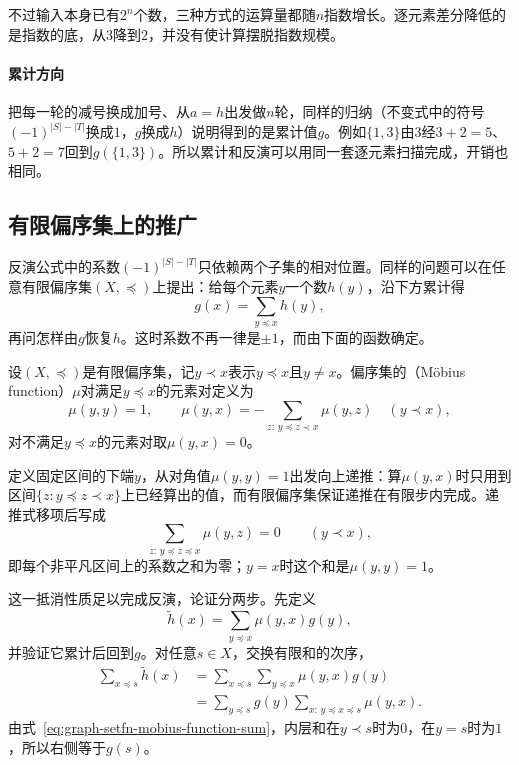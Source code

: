 不过输入本身已有$2^n$个数，三种方式的运算量都随$n$指数增长。逐元素差分降低的是指数的底，从$3$降到$2$，并没有使计算摆脱指数规模。

\paragraph{累计方向}
把每一轮的减号换成加号、从$a=h$出发做$n$轮，同样的归纳（不变式中的符号$(-1)^{|S|-|T|}$换成$1$，$g$换成$h$）说明得到的是累计值$g$。例如$\{1,3\}$由$3$经$3+2=5$、$5+2=7$回到$g(\{1,3\})$。所以累计和反演可以用同一套逐元素扫描完成，开销也相同。

\subsection{有限偏序集上的推广}
\label{sec:graph-setfn-poset-mobius}

反演公式中的系数$(-1)^{|S|-|T|}$只依赖两个子集的相对位置。同样的问题可以在任意有限偏序集$(X,\preceq)$上提出：给每个元素$y$一个数$h(y)$，沿下方累计得
\[
  g(x)=\sum_{y\preceq x}h(y),
\]
再问怎样由$g$恢复$h$。这时系数不再一律是$\pm1$，而由下面的函数确定。

\begin{definition}[Möbius 函数]
\label{def:graph-setfn-mobius-function}
设$(X,\preceq)$是有限偏序集，记$y\prec x$表示$y\preceq x$且$y\neq x$。偏序集的（Möbius function）$\mu$对满足$y\preceq x$的元素对定义为
\begin{equation}
  \mu(y,y)=1,\qquad \mu(y,x)=-\sum_{z:\,y\preceq z\prec x}\mu(y,z)\quad(y\prec x),
  \label{eq:graph-setfn-mobius-function-def}
\end{equation}
对不满足$y\preceq x$的元素对取$\mu(y,x)=0$。
\end{definition}

定义固定区间的下端$y$，从对角值$\mu(y,y)=1$出发向上递推：算$\mu(y,x)$时只用到区间$\{z:y\preceq z\prec x\}$上已经算出的值，而有限偏序集保证递推在有限步内完成。递推式移项后写成
\begin{equation}
  \sum_{z:\,y\preceq z\preceq x}\mu(y,z)=0\qquad(y\prec x),
  \label{eq:graph-setfn-mobius-function-sum}
\end{equation}
即每个非平凡区间上的系数之和为零；$y=x$时这个和是$\mu(y,y)=1$。

这一抵消性质足以完成反演，论证分两步。先定义
\[
  \tilde h(x)=\sum_{y\preceq x}\mu(y,x)g(y),
\]
并验证它累计后回到$g$。对任意$s\in X$，交换有限和的次序，
\[
  \begin{aligned}
  \sum_{x\preceq s}\tilde h(x)&=\sum_{x\preceq s}\sum_{y\preceq x}\mu(y,x)g(y)\\
  &=\sum_{y\preceq s}g(y)\sum_{x:\,y\preceq x\preceq s}\mu(y,x).
  \end{aligned}
\]
由式~\eqref{eq:graph-setfn-mobius-function-sum}，内层和在$y\prec s$时为$0$，在$y=s$时为$1$，所以右侧等于$g(s)$。

